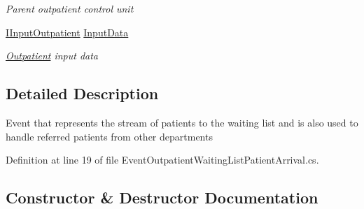 \begin{DoxyCompactItemize}
\begin{DoxyCompactList}\small\item\em Parent outpatient control unit \end{DoxyCompactList}\item 
\hyperlink{interface_general_health_care_elements_1_1_department_models_1_1_outpatient_1_1_i_input_outpatient}{I\+Input\+Outpatient} \hyperlink{class_general_health_care_elements_1_1_department_models_1_1_outpatient_1_1_waiting_list_1_1_eveb69cba3dbb99690008a282b7e42002d2_aed5c55e5b80923b84d7225148c967d7b}{Input\+Data}
\begin{DoxyCompactList}\small\item\em \hyperlink{namespace_general_health_care_elements_1_1_department_models_1_1_outpatient}{Outpatient} input data \end{DoxyCompactList}\end{DoxyCompactItemize}


\subsection{Detailed Description}
Event that represents the stream of patients to the waiting list and is also used to handle referred patients from other departments 



Definition at line 19 of file Event\+Outpatient\+Waiting\+List\+Patient\+Arrival.\+cs.



\subsection{Constructor \& Destructor Documentation}
